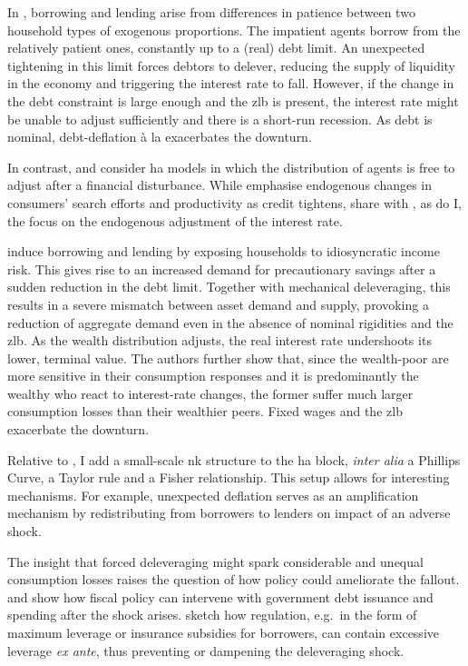 \documentclass[a4paper,12pt]{article} %
\numberwithin{equation}{section} %
\numberwithin{figure}{section}
\numberwithin{table}{section}
\begin{document}
In \textcite{egg2012}, borrowing and lending arise from differences in patience between two household types of exogenous proportions. The impatient agents borrow from the relatively patient ones, constantly up to a (real) debt limit. An unexpected tightening in this limit forces debtors to delever, reducing the supply of liquidity in the economy and triggering the interest rate to fall. However, if the change in the debt constraint is large enough and the \Gls{zlb} is present, the interest rate might be unable to adjust sufficiently and there is a short-run recession. As debt is nominal, debt-deflation à la \textcite{fisher1933} exacerbates the downturn.

In contrast, \textcite{riosrull2015} and \textcite{gl2017} consider \Gls{ha} models in which the distribution of agents is free to adjust after a financial disturbance. While \textcite{riosrull2015} emphasise endogenous changes in consumers' search efforts and productivity as credit tightens, \textcite{gl2017} share with \textcite{egg2012}, as do I, the focus on the endogenous adjustment of the interest rate.

\textcite{gl2017} induce borrowing and lending by exposing households to idiosyncratic income risk. This gives rise to an increased demand for precautionary savings after a sudden reduction in the debt limit. Together with mechanical deleveraging, this results in a severe mismatch between asset demand and supply, provoking a reduction of aggregate demand even in the absence of nominal rigidities and the \Gls{zlb}. As the wealth distribution adjusts, the real interest rate undershoots its lower, terminal value. The authors further show that, since the wealth-poor are more sensitive in their consumption responses and it is predominantly the wealthy who react to interest-rate changes, the former suffer much larger consumption losses than their wealthier peers. Fixed wages and the \Gls{zlb} exacerbate the downturn. 

Relative to \textcite{gl2017}, I add a small-scale \Gls{nk} structure to the \Gls{ha} block, \textit{inter alia} a Phillips Curve, a Taylor rule and a Fisher relationship. This setup allows for interesting mechanisms. For example, unexpected deflation serves as an amplification mechanism by redistributing from borrowers to lenders on impact of an adverse shock.

The insight that forced deleveraging might spark considerable and unequal consumption losses raises the question of how policy could ameliorate the fallout. \textcite{egg2012} and \textcite{gl2017} show how fiscal policy can intervene with government debt issuance and spending after the shock arises. \textcite{korinek2016} sketch how regulation, e.g.~in the form of maximum leverage or insurance subsidies for borrowers, can contain excessive leverage \textit{ex ante}, thus preventing or dampening the deleveraging shock.
\end{document}
